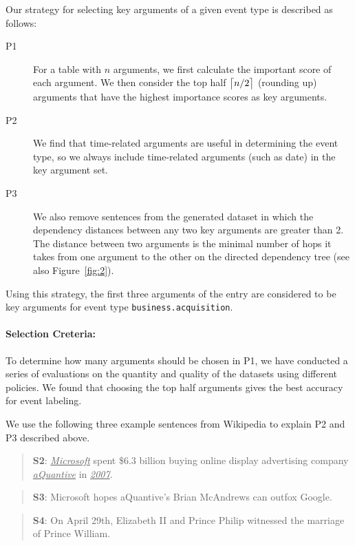 Our strategy for selecting key arguments of a given event type is described as follows:
%
\begin{description}

\item [P1] For a \CVT table with $n$ arguments, we first calculate the important score of each argument. We then consider the top half
    $\ceil[\big]{n/2}$ (rounding up) arguments that have the highest importance scores as key arguments.

\item [P2] We find that time-related arguments are useful in determining the event type, so we always include time-related arguments
    (such as date) in the key argument set.

\item [P3] We also remove sentences from the generated dataset in which the dependency distances between any two key arguments are
    greater than 2. The distance between two arguments is the minimal number of hops it takes from one argument to the other on the
    directed dependency tree (see also Figure~\ref{fig:2}).

\end{description}
%
Using this strategy, the first three arguments of the \CVT entry are considered to be key arguments for event type
\texttt{business.acquisition}.


\paragraph{Selection Creteria: }
To determine how many arguments should be chosen in P1, we have conducted a series of evaluations on the quantity and
quality of the datasets using different policies. We found that choosing the top half arguments %
gives the best accuracy for event labeling.

We use the following three example sentences from Wikipedia%
to explain P2 and P3 %
described above. %
%
\begin{quote}
\textbf{S2}: \underline{\emph{Microsoft}} spent \$6.3 billion buying online display advertising company \underline{\emph{aQuantive}} in
\underline{\emph{2007}}.
\end{quote}
\begin{quote}
\textbf{S3}: Microsoft hopes aQuantive's Brian McAndrews can outfox Google.
\end{quote}
\begin{quote}
\textbf{S4}: On April 29th, Elizabeth II and Prince Philip witnessed the marriage of Prince William.
\end{quote}

